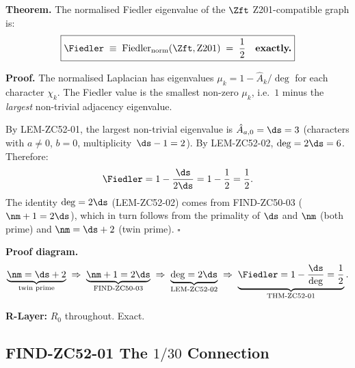 \documentclass[12pt, a4paper]{article}
\begin{document}
\begin{formalbox}[title={THM-ZC52-01: Fiedler Exactness Theorem
  (Exact, $R_0$)}]
\textbf{Theorem.}
The normalised Fiedler eigenvalue of the $\Zft$ Z201-compatible
graph is:
\begin{equation}\label{zc52:eq:fiedler}
  \boxed{
  \Fiedler
  \;\equiv\;
  \text{Fiedler}_{\rm norm}(\Zft,\text{Z201})
  \;=\; \frac{1}{2} \quad \textbf{exactly.}
  }
\end{equation}

\textbf{Proof.}
The normalised Laplacian has eigenvalues
$\mu_k = 1 - \hat{A}_k/\deg$ for each character $\chi_k$.
The Fiedler value is the smallest non-zero $\mu_k$,
i.e.\ $1$ minus the \emph{largest} non-trivial adjacency eigenvalue.

By LEM-ZC52-01, the largest non-trivial eigenvalue is
$\hat{A}_{a,0} = \ds = 3$ (characters with $a\neq 0$, $b=0$,
multiplicity~$\ds-1 = 2$).
By LEM-ZC52-02, $\deg = 2\ds = 6$.
Therefore:
\[
  \Fiedler
  = 1 - \frac{\ds}{2\ds}
  = 1 - \frac{1}{2}
  = \frac{1}{2}.
\]
The identity $\deg = 2\ds$ (LEM-ZC52-02) comes from
FIND-ZC50-03 ($\nm+1=2\ds$), which in turn follows from
the primality of $\ds$ and $\nm$ (both prime) and
$\nm = \ds+2$ (twin prime). \hfill$\square$

\textbf{Proof diagram.}
\[
  \underbrace{\nm=\ds+2}_{\text{twin prime}}
  \;\Rightarrow\;
  \underbrace{\nm+1=2\ds}_{\text{FIND-ZC50-03}}
  \;\Rightarrow\;
  \underbrace{\deg=2\ds}_{\text{LEM-ZC52-02}}
  \;\Rightarrow\;
  \underbrace{\Fiedler = 1 - \frac{\ds}{\deg}
    = \frac{1}{2}}_{\text{THM-ZC52-01}}.
\]

\textbf{R-Layer:} $R_0$ throughout. Exact.
\end{formalbox}

\subsection{FIND-ZC52-01 \quad The $1/30$ Connection}

\end{document}
